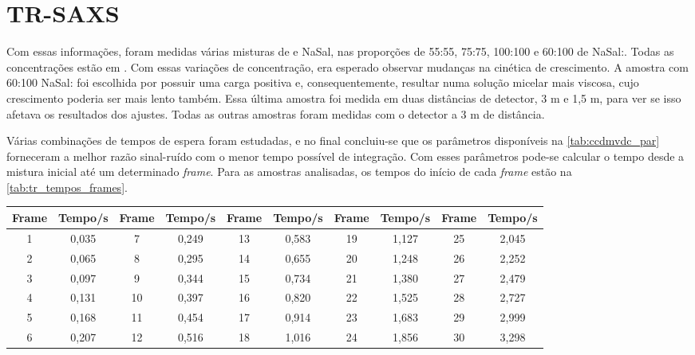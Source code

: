 	\section{TR-SAXS} 
	\label{sec:tr-saxs}
	Com essas informações, foram medidas várias misturas de \TTAB{} e NaSal, nas proporções de 55:55, 75:75, 100:100 e 60:100 de NaSal:\TTAB. Todas as concentrações estão em \mM. Com essas variações de concentração, era esperado observar mudanças na cinética de crescimento. A amostra com 60:100 NaSal:\TTAB{} foi escolhida por possuir uma carga positiva e, consequentemente, resultar numa solução micelar mais viscosa, cujo crescimento poderia ser mais lento também. Essa última amostra foi medida em duas distâncias de detector, 3 m e 1,5 m, para ver se isso afetava os resultados dos ajustes. Todas as outras amostras foram medidas com o detector a 3 m de distância.
	
	Várias combinações de tempos de espera foram estudadas, e no final concluiu-se que os parâmetros disponíveis na \autoref{tab:ccdmvdc_par} forneceram a melhor razão sinal-ruído com o menor tempo possível de integração. Com esses parâmetros pode-se calcular o tempo desde a mistura inicial até um determinado \emph{frame}. Para as amostras analisadas, os tempos do início de cada \emph{frame} estão na \autoref{tab:tr_tempos_frames}.
	
				\begin{table}[h]
		{%
			\begin{tabular}{c c | c c | c c | c c | c c}
				\toprule
				Frame & Tempo/s & Frame & Tempo/s & Frame & Tempo/s & Frame & Tempo/s & Frame & Tempo/s \\ \midrule
				  1   & 0,035   & 7     & 0,249   & 13    & 0,583   & 19    & 1,127   & 25    & 2,045   \\
				  2   & 0,065   & 8     & 0,295   & 14    & 0,655   & 20    & 1,248   & 26    & 2,252   \\
				  3   & 0,097   & 9     & 0,344   & 15    & 0,734   & 21    & 1,380   & 27    & 2,479   \\
				  4   & 0,131   & 10    & 0,397   & 16    & 0,820   & 22    & 1,525   & 28    & 2,727   \\
				  5   & 0,168   & 11    & 0,454   & 17    & 0,914   & 23    & 1,683   & 29    & 2,999   \\
				  6   & 0,207   & 12    & 0,516   & 18    & 1,016   & 24    & 1,856   & 30    & 3,298	\\ \bottomrule
			\end{tabular}
		}{}
	\end{table}  
	
